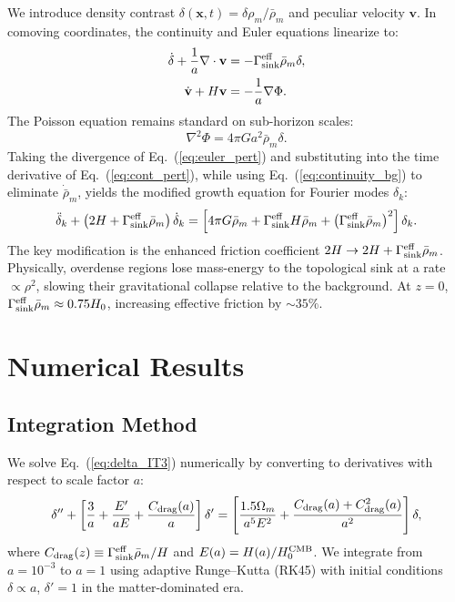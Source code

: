 \documentclass[12pt,a4paper]{article}
\begin{document}
We introduce density contrast $\delta(\mathbf{x},t) = \delta\rho_m/\bar{\rho}_m$ and peculiar velocity $\mathbf{v}$. In comoving coordinates, the continuity and Euler equations linearize to:
\begin{align}
\dot{\delta} + \frac{1}{a}\nabla\cdot\mathbf{v} &= -\Gamma_{\rm sink}^{\rm eff}\bar{\rho}_m \delta, \label{eq:cont_pert} \\
\dot{\mathbf{v}} + H\mathbf{v} &= -\frac{1}{a}\nabla\Phi. \label{eq:euler_pert}
\end{align}
The Poisson equation remains standard on sub-horizon scales:
\begin{equation}
\nabla^2\Phi = 4\pi G a^2 \bar{\rho}_m \delta.
\label{eq:poisson}
\end{equation}
Taking the divergence of Eq.~(\ref{eq:euler_pert}) and substituting into the time derivative of Eq.~(\ref{eq:cont_pert}), while using Eq.~(\ref{eq:continuity_bg}) to eliminate $\dot{\bar{\rho}}_m$, yields the modified growth equation for Fourier modes $\delta_k$:
\begin{equation}
\ddot{\delta}_k + \left(2H + \Gamma_{\rm sink}^{\rm eff}\bar{\rho}_m\right)\dot{\delta}_k = 
\left[4\pi G \bar{\rho}_m + \Gamma_{\rm sink}^{\rm eff} H \bar{\rho}_m + \left(\Gamma_{\rm sink}^{\rm eff}\bar{\rho}_m\right)^2\right]\delta_k.
\label{eq:delta_IT3}
\end{equation}
The key modification is the enhanced friction coefficient $2H \to 2H + \Gamma_{\rm sink}^{\rm eff}\bar{\rho}_m$. Physically, overdense regions lose mass-energy to the topological sink at a rate $\propto \rho^2$, slowing their gravitational collapse relative to the background. At $z=0$, $\Gamma_{\rm sink}^{\rm eff}\bar{\rho}_m \approx 0.75 H_0$, increasing effective friction by $\sim 35\%$.

\section{Numerical Results}

\subsection{Integration Method}

We solve Eq.~(\ref{eq:delta_IT3}) numerically by converting to derivatives with respect to scale factor $a$:
\begin{equation}
\delta'' + \left[\frac{3}{a} + \frac{E'}{aE} + \frac{C_{\rm drag}(a)}{a}\right]\delta' = 
\left[\frac{1.5\Omega_m}{a^5 E^2} + \frac{C_{\rm drag}(a) + C_{\rm drag}^2(a)}{a^2}\right]\delta,
\end{equation}
where $C_{\rm drag}(z) \equiv \Gamma_{\rm sink}^{\rm eff}\bar{\rho}_m/H$ and $E(a) = H(a)/H_0^{\rm CMB}$. We integrate from $a=10^{-3}$ to $a=1$ using adaptive Runge--Kutta (RK45) with initial conditions $\delta \propto a$, $\delta' = 1$ in the matter-dominated era.
\end{document}
